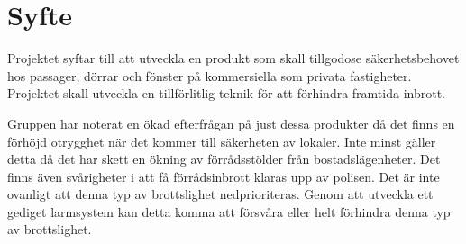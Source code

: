 \section{Syfte}

Projektet syftar till att utveckla en produkt som skall tillgodose säkerhetsbehovet hos passager, dörrar och fönster på kommersiella som privata fastigheter. Projektet skall utveckla en tillförlitlig teknik för att förhindra framtida inbrott.

Gruppen har noterat en ökad efterfrågan på just dessa produkter då det finns en förhöjd otrygghet när det kommer till säkerheten av lokaler. Inte minst gäller detta då det har skett en ökning av förrådsstölder från bostadslägenheter\cite{ifSka}.  Det finns även svårigheter i att få förrådsinbrott klaras upp av polisen\cite{hemHyra}. Det är inte ovanligt att denna typ av brottslighet nedprioriteras. Genom att utveckla ett gediget larmsystem kan detta komma att försvåra eller helt förhindra denna typ av brottslighet.
